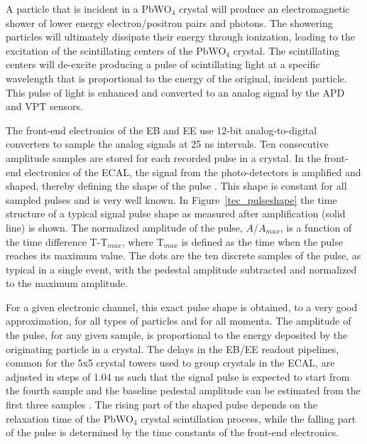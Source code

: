 A particle that is incident in a PbWO$_{4}$ crystal will produce an electromagnetic shower of lower energy electron/positron pairs and photons. The showering particles will ultimately dissipate their energy through ionization, leading to the excitation of the scintillating centers of the PbWO$_{4}$ crystal. The scintillating centers will de-excite producing a pulse of scintillating light at a specific wavelength that is proportional to the energy of the original, incident particle. This pulse of light is enhanced and converted to an analog signal by the APD and VPT sensors.

The front-end electronics of the EB and EE use 12-bit analog-to-digital converters to sample the analog signals at 25 ns intervals. Ten consecutive amplitude samples are stored for each recorded pulse in a crystal. In the front-end electronics of the ECAL, the signal from the photo-detectors is amplified and shaped, thereby defining the shape of the pulse \cite{Karimäki:368412}. This shape is constant for all sampled pulses and is very well known. In Figure~\ref{tec_pulseshape} the time structure of a typical signal pulse shape as measured after amplification (solid line) is shown. The normalized amplitude of the pulse, $A/A_{max}$, is a function of the time difference T-T$_{max}$, where T$_{max}$ is defined as the time when the pulse reaches its maximum value. The dots are the ten discrete samples of the pulse, as typical in a single event, with the pedestal amplitude subtracted and normalized to the maximum amplitude. 

For a given electronic channel, this exact pulse shape is obtained, to a very good approximation, for all types of particles and for all momenta. The amplitude of the pulse, for any given sample, is proportional to the energy deposited by the originating particle in a crystal. The delays in the EB/EE readout pipelines, common for the 5x5 crystal towers used to group crystals in the ECAL, are adjusted in steps of 1.04 ns such that the signal pulse is expected to start from the fourth sample and the baseline pedestal amplitude can be estimated from the first three samples \cite{CMS-NOTE-2010-012}. The rising part of the shaped pulse depends on the relaxation time of the PbWO$_{4}$ crystal scintillation process, while the falling part of the pulse is determined by the time constants of the front-end electronics.

